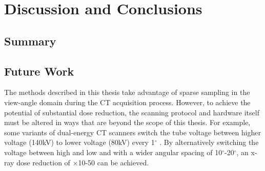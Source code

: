 \chapter{Discussion and Conclusions}

\label{ch:conclusions}

\section{Summary}


\section{Future Work}

The methods described in this thesis take advantage of sparse sampling in the view-angle domain during the CT acquisition process. However, to achieve the potential of substantial dose reduction, the scanning protocol and hardware itself must be altered in ways that are beyond the scope of this thesis. For example, some variants of dual-energy CT scanners switch the tube voltage between higher voltage (140kV) to lower voltage (80kV) every 1$^\circ$ 
\cite{goo2017dual}. By alternatively switching the voltage between high and low and with a wider angular spacing of 10$^\circ$-20$^\circ$, an x-ray dose reduction of $\times$10-50 can be achieved.

